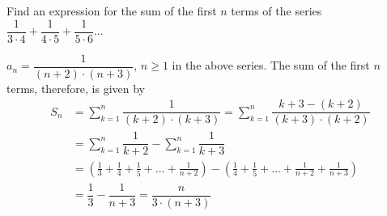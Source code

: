 
%
%
%
%
% 
% 

\question Find an expression for the sum of the first $n$ terms of the series 
$\dfrac{1}{3\cdot 4} + \dfrac{1}{4\cdot 5} + \dfrac{1}{5\cdot 6}\ldots$

\insertQR{}

\ifprintanswers
\fi 

\begin{solution}
	 $a_n = \dfrac{1}{(n+2)\cdot(n+3)},\, n \geq 1$ in the above series. The sum of the 
	 first $n$ terms, therefore, is given by 
	 \begin{align}
	 	S_n &= \sum_{k=1}^{n}\dfrac{1}{(k+2)\cdot(k+3)} = \sum_{k=1}^{n}\dfrac{k+3 - (k+2)}{(k+3)\cdot(k+2)} \\
	 	&= \sum_{k=1}^{n}\dfrac{1}{k+2} - \sum_{k=1}^{n}\dfrac{1}{k+3} \\
	 	&= \left( \frac{1}{3} + \frac{1}{4} + \frac{1}{5} + \ldots + \frac{1}{n+2}\right) - 
	 	\left( \frac{1}{4} + \frac{1}{5} + \ldots + \frac{1}{n+2} + \frac{1}{n+3}\right) \\
	 	&= \dfrac{1}{3} - \dfrac{1}{n+3} = \dfrac{n}{3\cdot(n+3)}
	 \end{align}
\end{solution}
